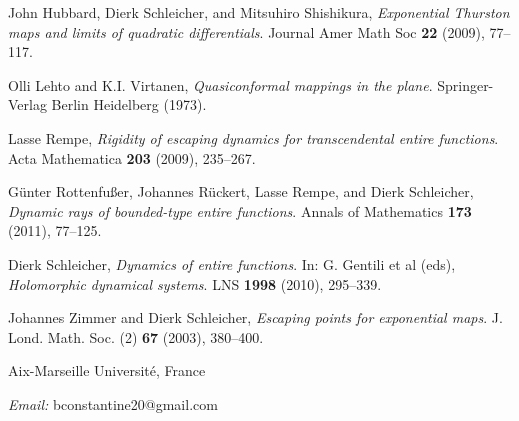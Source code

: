 \documentclass[10pt,reqno,a4paper]{amsart}
\numberwithin{figure}{section}
\numberwithin{equation}{section}
\begin{document}
\begin{thebibliography}{RSSS}
	
	John Hubbard, Dierk Schleicher, and Mitsuhiro Shishikura, 
	\emph{Exponential Thurston maps and limits of quadratic differentials}. Journal Amer Math Soc \textbf{22} (2009), 77--117.
%	
	
	
	Olli Lehto and K.I. Virtanen, \emph{Quasiconformal mappings in the plane}. Springer-Verlag Berlin Heidelberg (1973).
	
%	
	Lasse Rempe, \emph{Rigidity of escaping dynamics for transcendental entire functions}. Acta Mathematica \textbf{203} (2009), 235--267.
	
	
	G\"unter Rottenfu{\ss}er, Johannes R\"uckert, Lasse Rempe, and Dierk Schlei\-cher, \emph{Dynamic rays of bounded-type entire functions}. {Annals of Mathematics} \textbf{173} (2011), 77--125.
	
%	
%	
	
	Dierk Schleicher,
	\emph{Dynamics of entire functions}. In: G. Gentili et al (eds), \emph{Holomorphic dynamical systems}. LNS \textbf{1998} (2010), 295--339.
	
	
	Johannes Zimmer and Dierk Schleicher, 
	\emph{Escaping points for exponential maps}. 
	J. Lond. Math. Soc. (2) \textbf{67} (2003), 380--400.
	
\end{thebibliography}

\vspace{1em}
Aix-Marseille Universit\'e, France

\textit{Email:} bconstantine20@gmail.com
\end{document}
